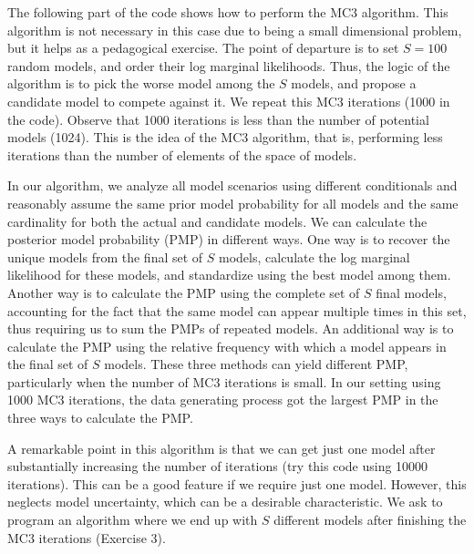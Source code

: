 The following part of the code shows how to perform the MC3 algorithm. This algorithm is not necessary in this case due to being a small dimensional problem, but it helps as a pedagogical exercise. The point of departure is to set $S=100$ random models, and order their log marginal likelihoods. Thus, the logic of the algorithm is to pick the worse model among the $S$ models, and propose a candidate model to compete against it. We repeat this MC3 iterations (1000 in the code). Observe that 1000 iterations is less than the number of potential models (1024). This is the idea of the MC3 algorithm, that is, performing less iterations than the number of elements of the space of models. 

In our algorithm, we analyze all model scenarios using different conditionals and reasonably assume the same prior model probability for all models and the same cardinality for both the actual and candidate models. We can calculate the posterior model probability (PMP) in different ways. One way is to recover the unique models from the final set of $S$ models, calculate the log marginal likelihood for these models, and standardize using the best model among them. Another way is to calculate the PMP using the complete set of $S$ final models, accounting for the fact that the same model can appear multiple times in this set, thus requiring us to sum the PMPs of repeated models. An additional way is to calculate the PMP using the relative frequency with which a model appears in the final set of $S$ models. These three methods can yield different PMP, particularly when the number of MC3 iterations is small. In our setting using 1000 MC3 iterations, the data generating process got the largest PMP in the three ways to calculate the PMP. 

A remarkable point in this algorithm is that we can get just one model after substantially increasing the number of iterations (try this code using 10000 iterations). This can be a good feature if we require just one model. However, this neglects model uncertainty, which can be a desirable characteristic. We ask to program an algorithm where we end up with $S$ different models after finishing the MC3 iterations (Exercise 3).

